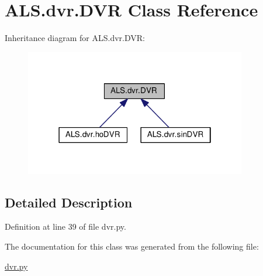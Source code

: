\hypertarget{class_a_l_s_1_1dvr_1_1_d_v_r}{\section{A\+L\+S.\+dvr.\+D\+V\+R Class Reference}
\label{class_a_l_s_1_1dvr_1_1_d_v_r}
}


Inheritance diagram for A\+L\+S.\+dvr.\+D\+V\+R\+:
\nopagebreak
\begin{figure}[H]
\begin{center}
\leavevmode
\includegraphics[width=274pt]{class_a_l_s_1_1dvr_1_1_d_v_r__inherit__graph}
\end{center}
\end{figure}


\subsection{Detailed Description}


Definition at line 39 of file dvr.\+py.



The documentation for this class was generated from the following file\+:\begin{DoxyCompactItemize}
\item 
\hyperlink{dvr_8py}{dvr.\+py}\end{DoxyCompactItemize}
